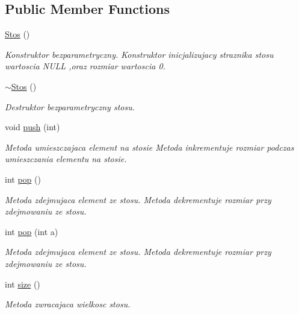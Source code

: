 \subsection*{Public Member Functions}
\begin{DoxyCompactItemize}
\item 
\hyperlink{a00018_a1de3b50386d5dfb56ddece17d0ea2389}{Stos} ()
\begin{DoxyCompactList}\small\item\em Konstruktor bezparametryczny. Konstruktor inicjalizujacy straznika stosu wartoscia N\+U\+L\+L ,oraz rozmiar wartoscia 0. \end{DoxyCompactList}\item 
\hyperlink{a00018_af9a198e2540e18adcc0b5259105fd78e}{$\sim$\+Stos} ()
\begin{DoxyCompactList}\small\item\em Destruktor bezparametryczny stosu. \end{DoxyCompactList}\item 
void \hyperlink{a00018_afe381df2afa35f3d122ca180300005dd}{push} (int)
\begin{DoxyCompactList}\small\item\em Metoda umieszczajaca element na stosie Metoda inkrementuje rozmiar podczas umieszczania elementu na stosie. \end{DoxyCompactList}\item 
int \hyperlink{a00018_aabb14b8a389c55da6e2b50fbb179ed56}{pop} ()
\begin{DoxyCompactList}\small\item\em Metoda zdejmujaca element ze stosu. Metoda dekrementuje rozmiar przy zdejmowaniu ze stosu. \end{DoxyCompactList}\item 
int \hyperlink{a00018_ad4af9fd54413ffc548df01a9d4244350}{pop} (int a)
\begin{DoxyCompactList}\small\item\em Metoda zdejmujaca element ze stosu. Metoda dekrementuje rozmiar przy zdejmowaniu ze stosu. \end{DoxyCompactList}\item 
int \hyperlink{a00018_a696195d5125d9bbe6b491bc5985f9461}{size} ()
\begin{DoxyCompactList}\small\item\em Metoda zwracajaca wielkosc stosu. \end{DoxyCompactList}\end{DoxyCompactItemize}


